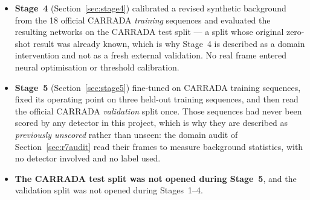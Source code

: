\begin{itemize}
\itemsep2pt
\item \textbf{Stage~4} (Section~\ref{sec:stage4}) calibrated a revised synthetic background from the
18 official CARRADA \emph{training} sequences and evaluated the resulting networks on the CARRADA
test split --- a split whose original zero-shot result was already known, which is why Stage~4 is
described as a domain intervention and not as a fresh external validation. No real frame entered
neural optimisation or threshold calibration.
\item \textbf{Stage~5} (Section~\ref{sec:stage5}) fine-tuned on CARRADA training sequences, fixed its
operating point on three held-out training sequences, and then read the official CARRADA
\emph{validation} split once. Those sequences had never been scored by any detector in this project,
which is why they are described as \emph{previously unscored} rather than unseen: the domain audit of
Section~\ref{sec:r7audit} read their frames to measure background statistics, with no detector
involved and no label used.
\item \textbf{The CARRADA test split was not opened during Stage~5}, and the validation split was not
opened during Stages~1--4.
\end{itemize}
